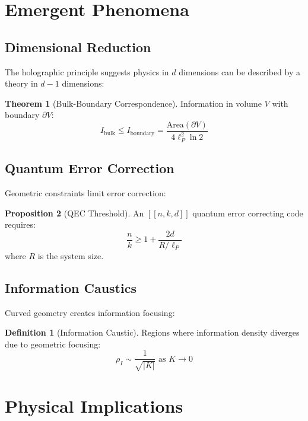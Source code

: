 \documentclass[11pt,a4paper]{article}
\theoremstyle{definition}
\newtheorem{definition}{Definition}[section]
\newtheorem{theorem}{Theorem}[section]
\newtheorem{proposition}[theorem]{Proposition}
\begin{document}
\section{Emergent Phenomena}

\subsection{Dimensional Reduction}

The holographic principle suggests physics in $d$ dimensions can be described by a theory in $d-1$ dimensions:

\begin{theorem}[Bulk-Boundary Correspondence]
Information in volume $V$ with boundary $\partial V$:
\begin{equation}
I_{\text{bulk}} \leq I_{\text{boundary}} = \frac{\text{Area}(\partial V)}{4\ell_P^2 \ln 2}
\end{equation}
\end{theorem}

\subsection{Quantum Error Correction}

Geometric constraints limit error correction:

\begin{proposition}[QEC Threshold]
An $[[n,k,d]]$ quantum error correcting code requires:
\begin{equation}
\frac{n}{k} \geq 1 + \frac{2d}{R/\ell_P}
\end{equation}
where $R$ is the system size.
\end{proposition}

\subsection{Information Caustics}

Curved geometry creates information focusing:

\begin{definition}[Information Caustic]
Regions where information density diverges due to geometric focusing:
\begin{equation}
\rho_I \sim \frac{1}{\sqrt{|K|}} \text{ as } K \to 0
\end{equation}
\end{definition}

\section{Physical Implications}
\end{document}
